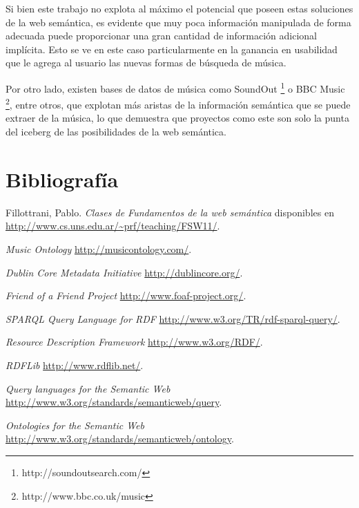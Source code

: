 \documentclass[a4paper,oneside]{report}
\begin{document}
Si bien este trabajo no explota al máximo el potencial que poseen estas soluciones de la web semántica, es evidente que muy poca información manipulada de forma adecuada puede proporcionar una gran cantidad de información adicional implícita. Esto se ve en este caso particularmente en la ganancia en usabilidad que le agrega al usuario las nuevas formas de búsqueda de música.

Por otro lado, existen bases de datos de música como SoundOut \footnote{http://soundoutsearch.com/} o BBC Music \footnote{http://www.bbc.co.uk/music}, entre otros, que explotan más aristas de la información semántica que se puede extraer de la música, lo que demuestra que proyectos como este son solo la punta del iceberg de las posibilidades de la web semántica.

\chapter{Bibliografía}

\begin{thebibliography}{9}

 Fillottrani, Pablo. \emph{Clases de Fundamentos de la web semántica}
disponibles en 
\url{http://www.cs.uns.edu.ar/~prf/teaching/FSW11/}.

 \emph{Music Ontology}
\url{http://musicontology.com/}.

 \emph{Dublin Core Metadata Initiative}
\url{http://dublincore.org/}.

 \emph{Friend of a Friend Project}
\url{http://www.foaf-project.org/}.

 \emph{SPARQL Query Language for RDF}
\url{http://www.w3.org/TR/rdf-sparql-query/}.

 \emph{Resource Description Framework}
\url{http://www.w3.org/RDF/}.

 \emph{RDFLib}
\url{http://www.rdflib.net/}.

 \emph{Query languages for the Semantic Web}
\url{http://www.w3.org/standards/semanticweb/query}.

 \emph{Ontologies for the Semantic Web}
\url{http://www.w3.org/standards/semanticweb/ontology}.

\end{thebibliography}

\appendix
\end{document}
